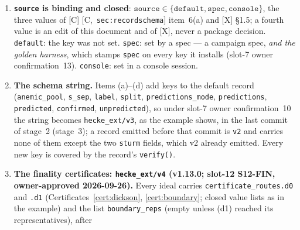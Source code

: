 \documentclass[11pt]{article}
\theoremstyle{remark}
\newcommand{\HA}[1]{[C,~\texttt{#1}]}      %
\begin{document}
\begin{enumerate}[label=(\alph*)]
  fingerprint, rendered as sixteen lower-case hex digits (\texttt{"0000000000000000"} at the
  defaults: the ``$0$'' of the paragraph above). A member of [X] \S1.5's inventory that is not
  registered is absent until its consumer registers it (\texttt{coefficient\_ring} is today a
  top-level key, not a settings entry; v1.9.0-pre.1: once slot-8 WP-3 registers it, it is also
  the \emph{last} settings entry, appended at the tail of the registry, and the top-level key
  stays, \S\ref{sec:ring}~(a)). Through v1.7.2 the example showed
  \texttt{\{key: value, \ldots, "source": \{\ldots\}, "fingerprint": "0"\}}, which no writer
  produced. \emph{Golden}: after slot-7 stage~1~(1) the golden harness reduces the
  \emph{top-level} \texttt{settings} object of its \texttt{ext\_json\_*} texts to
  \texttt{\{"fingerprint": \ldots\}} by a path-scoped redaction, so golden sees only the
  fingerprint and a key registered at its default moves no golden line; the record itself still
  carries the full block.
\item \textbf{\texttt{source} is binding and closed}: $\texttt{source}\in\{\texttt{default},
  \texttt{spec}, \texttt{console}\}$, the three values of [C] \HA{sec:recordschema} item~6(a)
  and [X] \S1.5; a fourth value is an edit of this document and of [X], never a package
  decision. \texttt{default}: the key was not set. \texttt{spec}: set by a spec --- a campaign
  spec, \emph{and the golden harness}, which stamps \texttt{spec} on every key it installs
  (slot-7 owner confirmation~13). \texttt{console}: set in a console session.
\item \textbf{The schema string.} Items (a)--(d) add keys to the default record
  (\texttt{anemic\_pool}, \texttt{s\_sep}, \texttt{label}, \texttt{split},
  \texttt{predictions\_mode}, \texttt{predictions}, \texttt{predicted}, \texttt{confirmed},
  \texttt{unpredicted}), so under slot-7 owner confirmation~10 the string becomes
  \texttt{hecke\_ext/v3}, as the example shows, in the last commit of stage~2 (stage~3); a
  record emitted before that commit is \texttt{v2} and carries none of them except the two
  \texttt{sturm} fields, which v2 already emitted. Every new key is covered by the record's
  \texttt{verify()}.
\item \textbf{The finality certificates: \texttt{hecke\_ext/v4} (v1.13.0; slot-12 S12-FIN,
  owner-approved 2026-09-26).} Every ideal carries \texttt{certificate\_routes.d0} and \texttt{.d1}
  (Certificates~\ref{cert:dickson}, \ref{cert:boundary}; closed value lists as in the example) and the list
  \texttt{boundary\_reps} (empty unless (d1) reached its representatives), after

\end{enumerate}
\end{document}

